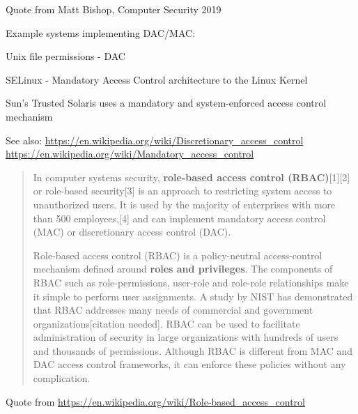 \documentclass[Screen16to9,17pt]{foils}
\begin{document}
Quote from Matt Bishop, Computer Security 2019


Example systems implementing DAC/MAC:
\begin{list2}
\item Unix file permissions - DAC
\item SELinux - Mandatory Access Control architecture to the Linux Kernel
\item Sun's Trusted Solaris uses a mandatory and system-enforced access control mechanism
\end{list2}

See also:
\url{https://en.wikipedia.org/wiki/Discretionary_access_control}\\
\url{https://en.wikipedia.org/wiki/Mandatory_access_control}


\begin{quote}
In computer systems security, {\bf role-based access control (RBAC)}[1][2] or role-based security[3] is an approach to restricting system access to unauthorized users. It is used by the majority of enterprises with more than 500 employees,[4] and can implement mandatory access control (MAC) or discretionary access control (DAC).

Role-based access control (RBAC) is a policy-neutral access-control mechanism defined around {\bf roles and privileges}. The components of RBAC such as role-permissions, user-role and role-role relationships make it simple to perform user assignments. A study by NIST has demonstrated that RBAC addresses many needs of commercial and government organizations[citation needed]. RBAC can be used to facilitate administration of security in large organizations with hundreds of users and thousands of permissions. Although RBAC is different from MAC and DAC access control frameworks, it can enforce these policies without any complication.
\end{quote}
Quote from \url{https://en.wikipedia.org/wiki/Role-based_access_control}





\end{document}
